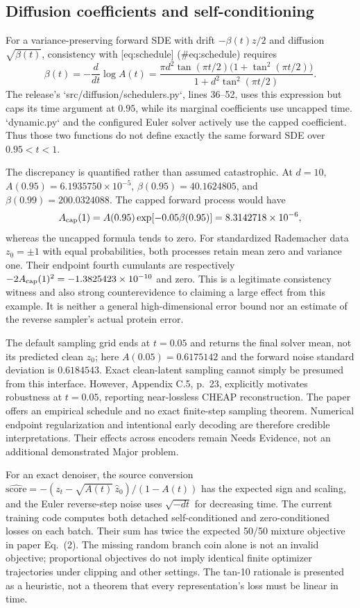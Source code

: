 \documentclass[10pt]{article}
\begin{document}
\subsection*{Diffusion coefficients and self-conditioning}
For a variance-preserving forward SDE with drift \(-\beta(t)z/2\) and diffusion \(\sqrt{\beta(t)}\), consistency with [eq:schedule] (\#eq:schedule) requires \[\beta(t)=-\frac{d}{dt}\log A(t)
 =\frac{\pi d^2\tan(\pi t/2)\bigl(1+\tan^2(\pi t/2)\bigr)}
 {1+d^2\tan^2(\pi t/2)}.\] The release’s `src/diffusion/schedulers.py`, lines 36–52, uses this expression but caps its time argument at \(0.95\), while its marginal coefficients use uncapped time. `dynamic.py` and the configured Euler solver actively use the capped coefficient. Thus those two functions do not define exactly the same forward SDE over \(0.95<t<1\).\par
The discrepancy is quantified rather than assumed catastrophic. At \(d=10\), \(A(0.95)=6.1935750\times10^{-5}\), \(\beta(0.95)=40.1624805\), and \(\beta(0.99)=200.0324088\). The capped forward process would have \[A_{\rm cap}(1)=A(0.95)\exp[-0.05\beta(0.95)]
 =8.3142718\times10^{-6},\] whereas the uncapped formula tends to zero. For standardized Rademacher data \(z_0=\pm1\) with equal probabilities, both processes retain mean zero and variance one. Their endpoint fourth cumulants are respectively \(-2A_{\rm cap}(1)^2=-1.3825423\times10^{-10}\) and zero. This is a legitimate consistency witness and also strong counterevidence to claiming a large effect from this example. It is neither a general high-dimensional error bound nor an estimate of the reverse sampler’s actual protein error.\par
The default sampling grid ends at \(t=0.05\) and returns the final solver mean, not its predicted clean \(z_0\); here \(A(0.05)=0.6175142\) and the forward noise standard deviation is \(0.6184543\). Exact clean-latent sampling cannot simply be presumed from this interface. However, Appendix C.5, p. 23, explicitly motivates robustness at \(t=0.05\), reporting near-lossless CHEAP reconstruction. The paper offers an empirical schedule and no exact finite-step sampling theorem. Numerical endpoint regularization and intentional early decoding are therefore credible interpretations. Their effects across encoders remain Needs Evidence, not an additional demonstrated Major problem.\par
For an exact denoiser, the source conversion \(\widehat{\mathrm{score}}=-(z_t-\sqrt{A(t)}\,\widehat z_0)/(1-A(t))\) has the expected sign and scaling, and the Euler reverse-step noise uses \(\sqrt{-dt}\) for decreasing time. The current training code computes both detached self-conditioned and zero-conditioned losses on each batch. Their sum has twice the expected 50/50 mixture objective in paper Eq. (2). The missing random branch coin alone is not an invalid objective; proportional objectives do not imply identical finite optimizer trajectories under clipping and other settings. The tan-10 rationale is presented as a heuristic, not a theorem that every representation’s loss must be linear in time.\par
\end{document}
